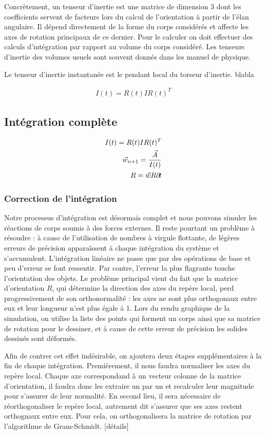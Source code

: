 Concrètement, un tenseur d'inertie est une matrice de dimension 3 dont
les coefficients servent de facteurs lors du calcul de l'orientation à
partir de l'élan angulaire. Il dépend directement de la forme du corps
considérés et affecte les axes de rotation principaux de ce
dernier. Pour le calculer on doit effectuer des calculs d'intégration
par rapport au volume du corps considéré. Les tenseurs d'inertie des
volumes usuels sont souvent donnés dans les manuel de physique.

Le tenseur d'inertie instantanée est le pendant local du torseur
d'inertie. blabla

\begin{align*}
  I(t) = R(t) I R(t)^T
\end{align*}

\subsection{Intégration complète}

\begin{align*}
  I(t) = R(t) I R(t)^T \\ \vec{w}_{n+1} = \frac{\vec{A}}{I(t)} \\ R =
  \vec{w} R \partial \! t
\end{align*}

\subsubsection{Correction de l'intégration}

Notre processus d'intégration est désormais complet et nous pouvons
simuler les réactions de corps soumis à des forces externes. Il reste
pourtant un problème à résoudre : à cause de l'utilisation de nombres
à virgule flottante, de légères erreurs de précision apparaîssent à
chaque intégration du système et s'accumulent. L'intégration linéaire
ne passe que par des opérations de base et peu d'erreur se font
ressentir. Par contre, l'erreur la plus flagrante touche l'orientation
des objets. Le problème principal vient du fait que la matrice
d'orientation $R$, qui détermine la direction des axes du repère
local, perd progressivement de son orthonormalité : les axes ne sont
plus orthogonaux entre eux et leur longueur n'est plus égale à 1. Lors
du rendu graphique de la simulation, on utilise la liste des points
qui forment un corps ainsi que sa matrice de rotation pour le
dessiner, et à cause de cette erreur de précision les solides dessinés
sont déformés.

Afin de contrer cet effet indésirable, on ajoutera deux étapes
supplémentaires à la fin de chaque intégration. Premièrement, il nous
faudra normaliser les axes du repère local. Chaque axe correspondand à
un vecteur colonne de la matrice d'orientation, il faudra donc les
extraire un par un et recalculer leur magnitude pour s'assurer de leur
normalité. En second lieu, il sera nécessaire de réorthogonaliser le
repère local, autrement dit s'assurer que ses axes restent orthognaux
entre eux. Pour cela, on orthogonalisera la matrice de rotation par
l'algorithme de Gram-Schmidt. [détails]
